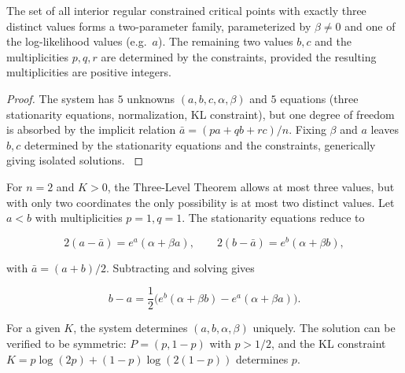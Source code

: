 \begin{corollary}
\label{ch:cor:three-level-family}
The set of all interior regular constrained critical points with
exactly three distinct values forms a two-parameter family, parameterized
by \(\beta\neq0\) and one of the log-likelihood values (e.g.\ \(a\)).
The remaining two values \(b,c\) and the multiplicities \(p,q,r\) are
determined by the constraints, provided the resulting multiplicities are
positive integers.
\end{corollary}

\begin{proof}
The system has \(5\) unknowns \((a,b,c,\alpha,\beta)\) and
\(5\) equations (three stationarity equations, normalization, KL
constraint), but one degree of freedom is absorbed by the implicit
relation \(\bar a = (pa+qb+rc)/n\).  Fixing \(\beta\) and \(a\) leaves
\(b,c\) determined by the stationarity equations and the constraints,
generically giving isolated solutions. \(\)
\end{proof}

\begin{example}[Binary Case \(n=2\)]
\label{ch:ex:three-level-binary}
For \(n=2\) and \(K>0\), the Three-Level Theorem allows at most three
values, but with only two coordinates the only possibility is at most
two distinct values.  Let \(a<b\) with multiplicities \(p=1,q=1\).
The stationarity equations reduce to

\[
2(a-\bar a)=e^{a}(\alpha+\beta a),\qquad
2(b-\bar a)=e^{b}(\alpha+\beta b),
\]

with \(\bar a=(a+b)/2\).  Subtracting and solving gives

\[
b-a = \frac{1}{2}\bigl(e^{b}(\alpha+\beta b) - e^{a}(\alpha+\beta a)\bigr).
\]

For a given \(K\), the system determines \((a,b,\alpha,\beta)\) uniquely.
The solution can be verified to be symmetric: \(P=(p,1-p)\) with
\(p>1/2\), and the KL constraint \(K = p\log(2p)+(1-p)\log(2(1-p))\)
determines \(p\).
\end{example}

